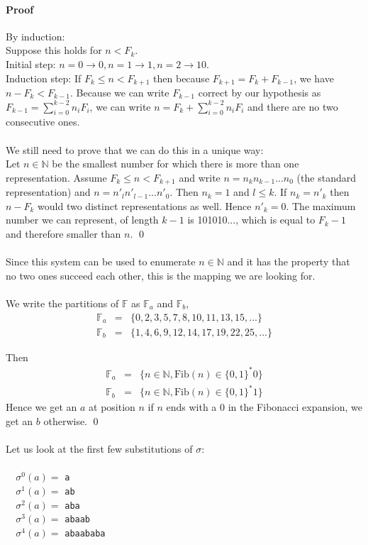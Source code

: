 \documentclass{article}
\begin{document}
\paragraph{Proof} By induction:\\
Suppose this holds for $n < F_k$.\\
Initial step:
$n = 0 \rightarrow 0, n = 1 \rightarrow 1, n = 2 \rightarrow 10$.\\
Induction step: If $F_k \le n < F_{k + 1}$ then because
$F_{k + 1} = F_k + F_{k - 1}$, we have $n - F_k < F_{k - 1}$. Because we
can write $F_{k - 1}$ correct by our hypothesis as
$F_{k - 1} = \sum_{i = 0}^{k - 2} n_i F_i$, we can write
$n = F_k + \sum_{i = 0}^{k - 2} n_i F_i$ and there are no two consecutive
ones.\\
\\
We still need to prove that we can do this in a unique way:\\
Let $n \in \mathbb{N}$ be the smallest number for which there is more than one
representation. Assume $F_k \le n < F_{k + 1}$ and write
$n = n_k n_{k - 1} ... n_0$ (the standard representation) and
$n = n'_l n'_{l - 1} ... n'_0$. Then $n_k = 1$ and $l \le k$. If $n_k = n'_k$
then $n - F_k$ would two distinct representations as well. Hence $n'_k = 0$.
The maximum number we can represent, of length $k - 1$ is 101010..., which is
equal to $F_k - 1$ and therefore smaller than $n$. \qed\\
\\
Since this system can be used to enumerate $n \in \mathbb{N}$ and it has the
property that no two ones succeed each other, this is the mapping we are
looking for.\\
\\
We write the partitions of $\mathbb{F}$ as $\mathbb{F}_a$ and $\mathbb{F}_b$,
\begin{eqnarray*}
  \mathbb{F}_a &=& \{0, 2, 3, 5, 7, 8, 10, 11, 13, 15, ...\}\\
  \mathbb{F}_b &=& \{1, 4, 6, 9, 12, 14, 17, 19, 22, 25, ...\}
\end{eqnarray*}

Then
\begin{eqnarray*}
  \mathbb{F}_a &=& \{n \in \mathbb{N}, \mathrm{Fib}(n) \in \{0, 1\}^* 0\}\\
  \mathbb{F}_b &=& \{n \in \mathbb{N}, \mathrm{Fib}(n) \in \{0, 1\}^* 1\}
\end{eqnarray*}
Hence we get an $a$ at position $n$ if $n$ ends with a 0 in the
Fibonacci expansion, we get an $b$ otherwise. \qed\\
\\
Let us look at the first few substitutions of $\sigma$:\\
\\
\verb#  #$\sigma^0(a) =$ \verb#a#\\
\verb#  #$\sigma^1(a) =$ \verb#ab#\\
\verb#  #$\sigma^2(a) =$ \verb#aba#\\
\verb#  #$\sigma^3(a) =$ \verb#abaab#\\
\verb#  #$\sigma^4(a) =$ \verb#abaababa#
\end{document}
